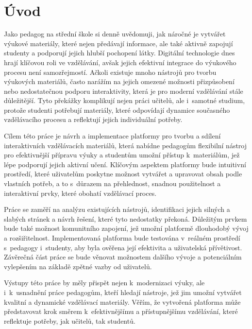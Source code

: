 \chapter*{Úvod}
\setcounter{page}{1}

Jako pedagog na střední škole si denně uvědomuji, jak náročné je vytvářet výukové materiály, které nejen předávají informace, ale také aktivně zapojují studenty a podporují jejich hlubší pochopení látky. 
Digitální technologie dnes hrají klíčovou roli ve vzdělávání, avšak jejich efektivní integrace do výukového procesu není samozřejmostí. 
Ačkoli existuje mnoho nástrojů pro tvorbu výukových materiálů, často narážím na jejich omezené možnosti přizpůsobení nebo nedostatečnou podporu interaktivity, která je pro moderní vzdělávání stále důležitější. 
Tyto překážky komplikují nejen práci učitelů, ale i~samotné studium, protože studenti potřebují materiály, které odpovídají dynamice současného vzdělávacího procesu a reflektují jejich individuální potřeby.

Cílem této práce je návrh a implementace platformy pro tvorbu a sdílení interaktivních vzdělávacích materiálů, která nabídne pedagogům flexibilní nástroj pro efektivnější přípravu výuky a studentům umožní přístup k~materiálům, jež lépe podporují jejich aktivní učení. 
Klíčovým aspektem platformy bude intuitivní prostředí, které uživatelům poskytne možnost vytvářet a upravovat obsah podle vlastních potřeb, a to s~důrazem na přehlednost, snadnou použitelnost a interaktivní prvky, které obohatí vzdělávací proces.

Práce se zaměří na analýzu existujících nástrojů, identifikaci jejich silných a slabých stránek a návrh řešení, které tyto nedostatky překoná. 
Důležitým prvkem bude také možnost komunitního zapojení, jež umožní platformě dlouhodobý vývoj a rozšiřitelnost. 
Implementovaná platforma bude testována v~reálném prostředí s~pedagogy i~studenty, aby byla ověřena její efektivita a uživatelská přívětivost. 
Závěrečná část práce se bude věnovat možnostem dalšího vývoje a potenciálním vylepšením na základě zpětné vazby od uživatelů.

Výstupy této práce by měly přispět nejen k~modernizaci výuky, ale i~k~usnadnění práce pedagogům, kteří hledají nástroje, jež jim umožní vytvářet kvalitní a dynamické vzdělávací materiály. 
Věřím, že vytvořená platforma může představovat krok směrem k~efektivnějšímu a přístupnějšímu vzdělávání, které reflektuje potřeby, jak učitelů, tak studentů.
